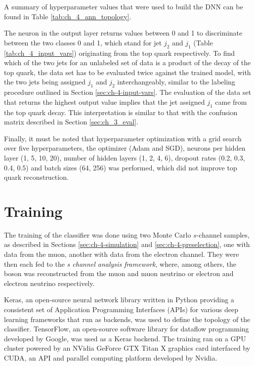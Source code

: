 A summary of hyperparameter values that were used to build the DNN can be found in Table \ref{tab:ch_4_ann_topology}.

The neuron in the output layer returns values between 0 and 1 to discriminate between the two classes 0 and 1, which stand for jet $j_2$ and $j_1$ (Table \ref{tab:ch_4_input_vars}) originating from the top quark respectively. To find which of the two jets for an unlabeled set of data is a product of the decay of the top quark, the data set has to be evaluated twice against the trained model, with the two jets being assigned $j_1$ and $j_2$ interchangeably, similar to the labeling procedure outlined in Section \ref{sec:ch-4-input-vars}. The evaluation of the data set that returns the highest output value implies that the jet assigned $j_1$ came from the top quark decay. This interpretation is similar to that with the confusion matrix described in Section \ref{sec:ch_3_eval}.

Finally, it must be noted that hyperparameter optimization with a grid search over five hyperparameters, the optimizer (Adam and SGD), neurons per hidden layer (1, 5, 10, 20), number of hidden layers (1, 2, 4, 6), dropout rates (0.2, 0.3, 0.4, 0.5) and batch sizes (64, 256) was performed, which did not improve top quark reconstruction.

\section{Training}
\label{sec:ch-4-training}
The training of the classifier was done using two Monte Carlo $s$-channel samples, as described in Sections \ref{sec:ch-4-simulation} and \ref{sec:ch-4-preselection}, one with data from the muon, another with data from the electron channel. They were then each fed to the \emph{s channel analysis framework}, where, among others, the \PW boson was reconstructed from the muon and muon neutrino or electron and electron neutrino respectively.

Keras, an open-source neural network library written in Python providing a consistent set of Application Programming Interfaces (APIs) for various deep learning frameworks that run as backends, was used to define the topology of the classifier. TensorFlow, an open-source software library for dataflow programming developed by Google, was used as a Keras backend. The training ran on a GPU cluster powered by an NVidia GeForce GTX Titan X \cite{misc:geforce} graphics card interfaced by CUDA, an API and parallel computing platform developed by Nvidia.

